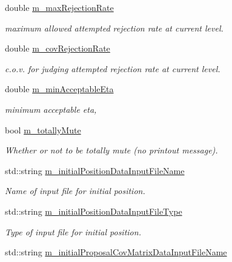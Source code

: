 \begin{DoxyCompactItemize}
double \hyperlink{class_q_u_e_s_o_1_1_m_l_sampling_level_options_ad7ec8ef589c49609d0082d3eb514bb13}{m\-\_\-max\-Rejection\-Rate}
\begin{DoxyCompactList}\small\item\em maximum allowed attempted rejection rate at current level. \end{DoxyCompactList}\item 
double \hyperlink{class_q_u_e_s_o_1_1_m_l_sampling_level_options_a8efaf9dfed7ff9f87c9a40aa8e8217a8}{m\-\_\-cov\-Rejection\-Rate}
\begin{DoxyCompactList}\small\item\em c.\-o.\-v. for judging attempted rejection rate at current level. \end{DoxyCompactList}\item 
double \hyperlink{class_q_u_e_s_o_1_1_m_l_sampling_level_options_a8230c7dd67833668237d3dc5b19c53c5}{m\-\_\-min\-Acceptable\-Eta}
\begin{DoxyCompactList}\small\item\em minimum acceptable eta, \end{DoxyCompactList}\item 
bool \hyperlink{class_q_u_e_s_o_1_1_m_l_sampling_level_options_aeb5b3d634be08ac24bdc008ecfbf08b6}{m\-\_\-totally\-Mute}
\begin{DoxyCompactList}\small\item\em Whether or not to be totally mute (no printout message). \end{DoxyCompactList}\item 
std\-::string \hyperlink{class_q_u_e_s_o_1_1_m_l_sampling_level_options_ac27dd9d3b5a376bfd146caa62fa32613}{m\-\_\-initial\-Position\-Data\-Input\-File\-Name}
\begin{DoxyCompactList}\small\item\em Name of input file for initial position. \end{DoxyCompactList}\item 
std\-::string \hyperlink{class_q_u_e_s_o_1_1_m_l_sampling_level_options_a582573c99a718b1eefe417c0cccf071f}{m\-\_\-initial\-Position\-Data\-Input\-File\-Type}
\begin{DoxyCompactList}\small\item\em Type of input file for initial position. \end{DoxyCompactList}\item 
std\-::string \hyperlink{class_q_u_e_s_o_1_1_m_l_sampling_level_options_aa2dd58cb7865577da082fde9f0b180cb}{m\-\_\-initial\-Proposal\-Cov\-Matrix\-Data\-Input\-File\-Name}

\end{DoxyCompactItemize}
